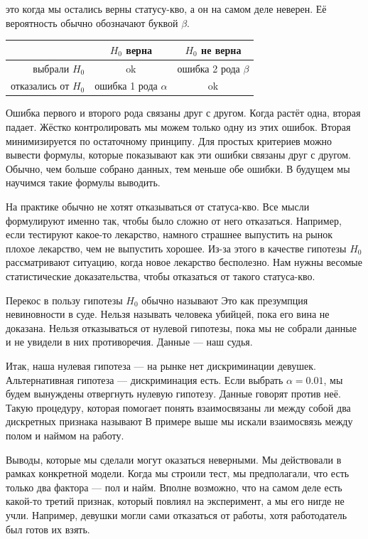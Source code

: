 \documentclass[12pt, a4paper, oneside]{article}
\begin{document}
 это когда мы остались верны статусу-кво, а он на самом деле неверен. Её вероятность обычно обозначают буквой $\beta$. 

\begin{center}
	\begin{tabular}{|r|c|c|}
	\hline
	                    & $H_0$ верна & $H_0$ не верна \\  \hline 
	выбрали $H_0$       &  ok &  ошибка 2 рода  $\beta$ \\      \hline 
	отказались от $H_0$ &  ошибка 1 рода $\alpha$ &  ok \\      \hline 
	\end{tabular}
\end{center}

Ошибка первого и второго рода связаны друг с другом. Когда растёт одна, вторая падает. Жёстко контролировать мы можем только одну из этих ошибок. Вторая минимизируется по остаточному принципу. Для простых критериев можно вывести формулы, которые показывают как эти ошибки связаны друг с другом. Обычно, чем больше собрано данных, тем меньше обе ошибки. В будущем мы научимся такие формулы выводить. 

На практике обычно не хотят отказываться от статуса-кво. Все мысли формулируют именно так, чтобы было сложно от него отказаться. Например, если тестируют какое-то лекарство, намного страшнее выпустить на рынок плохое лекарство, чем не выпустить хорошее. Из-за этого в качестве гипотезы $H_0$ рассматривают ситуацию, когда новое лекарство бесполезно. Нам нужны весомые статистические доказательства, чтобы отказаться от такого статуса-кво. 

Перекос в пользу гипотезы $H_0$ обычно называют  Это как презумпция невиновности в суде.  Нельзя называть человека убийцей, пока его вина не доказана. Нельзя отказываться от нулевой гипотезы, пока мы не собрали данные и не увидели в них противоречия. Данные --- наш судья. 

Итак, наша нулевая гипотеза --- на рынке нет дискриминации девушек. Альтернативная гипотеза --- дискриминация есть. Если выбрать $\alpha = 0.01$, мы будем вынуждены отвергнуть нулевую гипотезу. Данные говорят против неё. Такую процедуру, которая помогает понять взаимосвязаны ли между собой два дискретных признака называют  В примере выше мы искали взаимосвязь между полом и наймом на работу. 

Выводы, которые мы сделали могут оказаться неверными. Мы действовали в рамках конкретной модели. Когда мы строили тест, мы предполагали, что есть только два фактора --- пол и найм. Вполне возможно, что на самом деле есть какой-то третий признак, который повлиял на эксперимент, а мы его нигде не учли. Например, девушки могли сами отказаться от работы, хотя работодатель был готов их взять. 
\end{document}
